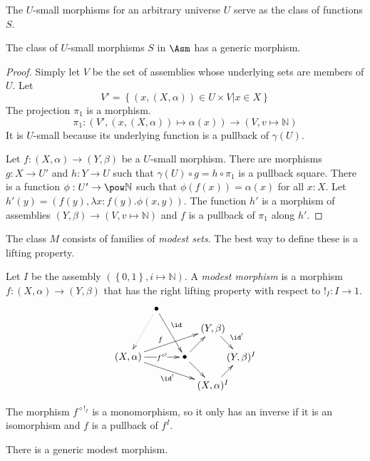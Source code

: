 \documentclass{tac}
\newcommand\set[1]{\left\{#1\right\}}
\newcommand\N{\mathbb N}
\newcommand\bang{!}
\newcommand\of{:}
\newcommand\gen\gamma
\newcommand\pe[1]{^{\diamond #1}}
\begin{document}
The $U$-small morphisms for an arbitrary universe $U$ serve as the class of functions $S$.

\begin{lemma} The class of $U$-small morphisms $S$ in $\Asm$ has a generic morphism. \end{lemma}

\begin{proof}
Simply let $V$ be the set of assemblies whose underlying sets are members of $U$.
Let 
\[ V'=\set{(x,(X,\alpha)) \in U\times V| x\in X} \]
The projection $\pi_1$ is a morphism. 
\[\pi_1\of(V',(x,(X,\alpha))\mapsto \alpha(x))\to(V,v\mapsto\N) \]
It is $U$-small because its underlying function is a pullback of $\gen(U)$. 

Let $f\of (X,\alpha)\to (Y,\beta)$ be a $U$-small morphism. There are morphisms $g\of X\to U'$ and $h\of Y\to U$ such that $\gen(U)\circ g = h\circ \pi_1$ is a pullback square. There is a function $\phi\of U'\to\pow\N$ such that $\phi(f(x))=\alpha(x)$ for all $x\of X$. Let $h'(y) = (f(y),\lambda x\of f(y).\phi(x,y))$. The function $h'$ is a morphism of assemblies $(Y,\beta)\to (V,v\mapsto\N)$ and $f$ is a pullback of $\pi_1$ along $h'$.
\end{proof}

The class $M$ consists of families of \emph{modest sets}. The best way to define these is a lifting property.

\begin{definition} Let $I$ be the assembly $(\set{0,1},i\mapsto\N)$. A \emph{modest morphism} is a morphism $f\of(X,\alpha)\to(Y,\beta)$ that has the right lifting property with respect to $\bang_I\of I\to 1$.
\[\xy
(0,10)*+{(X,\alpha)}="left", (10,27)*+{\bullet}="extra",(20,10)*+{\bullet}="middle", (30,20)*+{(Y,\beta)}="top", (30,0)*+{(X,\alpha)^I}="bottom", (40,10)*+{(Y,\beta)^I}="right"
\ar^(.4)f "left";"top" \ar|(.6){f\pe\bang} "left";"middle" \ar_{\id^\bang} "left";"bottom"
\ar "middle";"top" \ar"middle";"bottom"
\ar^{\id^\bang} "top";"right" \ar "bottom";"right"
\ar^(.4){\id} "extra";"middle"  \ar@{.>} "extra";"left"
\endxy\]
\end{definition}

The morphism $f\pe{\bang_I}$ is a monomorphism, so it only has an inverse if it is an isomorphism and $f$ is a pullback of $f^I$.

\begin{lemma} There is a generic modest morphism. \end{lemma}
\end{document}

